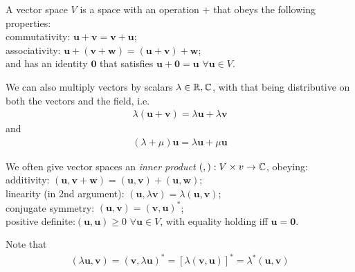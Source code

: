 \documentclass[a4paper]{article}
\begin{document}
\begin{defi}
A vector space $V$ is a space with an operation $+$ that obeys the following properties:\\
commutativity: $\mathbf{u} + \mathbf{v} = \mathbf{v} + \mathbf{u}$;\\
associativity: $\mathbf{u} + \left(\mathbf{v} + \mathbf{w}\right) = \left(\mathbf{u} + \mathbf{v}\right) + \mathbf{w}$;\\
and has an identity $\mathbf{0}$ that satisfies $\mathbf{u} + \mathbf{0} = \mathbf{u}$ $\forall \mathbf{u} \in V$.

We can also multiply vectors by scalars $\lambda \in \mathbb{R}, \mathbb{C}$, with that being distributive on both the vectors and the field, i.e.
\begin{equation*}
\begin{aligned}
\lambda \left(\mathbf{u} + \mathbf{v}\right) = \lambda \mathbf{u} + \lambda \mathbf{v}
\end{aligned}
\end{equation*}
and
\begin{equation*}
\begin{aligned}
\left(\lambda+\mu\right) \mathbf{u} = \lambda \mathbf{u} + \mu \mathbf{u}
\end{aligned}
\end{equation*}
\end{defi}

We often give vector spaces an \emph{inner product} $\left(,\right): V\times v \to \mathbb{C}$, obeying:\\
additivity: $\left(\mathbf{u},\mathbf{v}+\mathbf{w}\right) = \left(\mathbf{u},\mathbf{v}\right) + \left(\mathbf{u},\mathbf{w}\right)$;\\
linearity (in 2nd argument): $\left(\mathbf{u},\lambda \mathbf{v}\right) = \lambda \left(\mathbf{u},\mathbf{v}\right)$;\\
conjugate symmetry: $\left(\mathbf{u},\mathbf{v}\right) = \left(\mathbf{v},\mathbf{u}\right)^*$;\\
positive definite:$\left(\mathbf{u},\mathbf{u}\right)\geq 0$ $\forall \mathbf{u}\in V$, with equality holding iff $\mathbf{u} = \mathbf{0}$.

Note that
\begin{equation*}
\begin{aligned}
\left(\lambda\mathbf{u},\mathbf{v}\right) = \left(\mathbf{v},\lambda\mathbf{u}\right)^* = \left[\lambda\left(\mathbf{v},\mathbf{u}\right)\right]^* = \lambda^* \left(\mathbf{u},\mathbf{v}\right)
\end{aligned}
\end{equation*}
\end{document}
